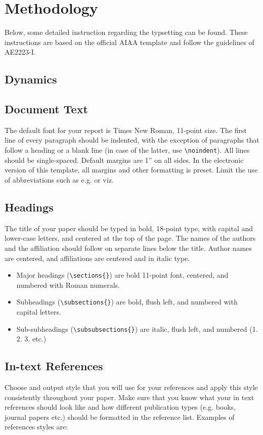 \section{Methodology}

Below, some detailed instruction regarding the typsetting can be found. These instructions are based on the official AIAA template and follow the guidelines of AE2223-I.

\subsection{Dynamics}


\subsection{Document Text}
The default font for your report is Times New Roman, 11-point size. The first line of every paragraph should be indented, with the exception of paragraphs that follow a heading or a blank line (in case of the latter, use \verb+\noindent+). All lines should be single-spaced. Default margins are 1” on all sides. In the electronic version of this template, all margins and other formatting is preset. Limit the use of abbreviations such as e.g. or viz.

\subsection{Headings}
The title of your paper should be typed in bold, 18-point type, with capital and lower-case letters, and centered at the top of the page. The names of the authors and the affiliation should follow on separate lines below the title. Author names are centered, and affiliations are centered and in italic type.

\begin{itemize}
    \item Major headings (\verb+\sections{}+) are bold 11-point font, centered, and numbered with Roman numerals.
    \item Subheadings (\verb+\subsections{}+) are bold, flush left, and numbered with capital letters.
    \item Sub-subheadings (\verb+\subsubsections{}+) are italic, flush left, and numbered (1. 2. 3. etc.)
\end{itemize}

\subsection{In-text References}
Choose and output style that you will use for your references and apply this style consistently throughout your paper. Make sure that you know what your in text references should look like and how different publication types (e.g. books, journal papers etc.) should  be formatted in the reference list.  Examples of references styles are:

